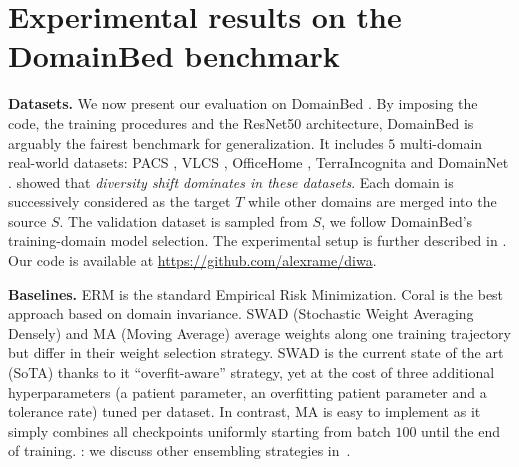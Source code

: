 \clearpage
\section{Experimental results on the DomainBed benchmark}%
\label{sec:domainbed}%
\textbf{Datasets.}
We now present our evaluation on DomainBed \cite{gulrajani2021in}.
By imposing the code, the training procedures and the ResNet50 \cite{he51deep} architecture, DomainBed is arguably the fairest benchmark for \ood generalization.
It includes $5$ multi-domain real-world datasets: PACS \cite{li2017deeper}, VLCS \cite{fang2013unbiased}, OfficeHome \cite{venkateswara2017deep}, TerraIncognita \cite{beery2018recognition} and DomainNet \cite{peng2019moment}. \cite{ye2021odbench} showed that \textit{diversity shift dominates in these datasets}. Each domain is successively considered as the target $T$ while other domains are merged into the source $S$. The validation dataset is sampled from $S$, \ie we follow DomainBed's training-domain model selection.
The experimental setup is further described in .
Our code is available at \url{https://github.com/alexrame/diwa}.%

\textbf{Baselines.}
ERM is the standard Empirical Risk Minimization.
Coral \cite{coral216aaai} is the best approach based on domain invariance.
SWAD (Stochastic Weight Averaging Densely) \cite{cha2021wad} and MA (Moving Average) \cite{arpit2021ensemble} average weights along one training trajectory but differ in their weight selection strategy.
SWAD \cite{cha2021wad} is the current state of the art (SoTA) thanks to it \enquote{overfit-aware} strategy, yet at the cost of three additional hyperparameters (a patient parameter, an overfitting patient parameter and a tolerance rate) tuned per dataset.
In contrast, MA \cite{arpit2021ensemble} is easy to implement as it simply combines all checkpoints uniformly starting from batch $100$ until the end of training.
: we discuss other ensembling strategies in~.

